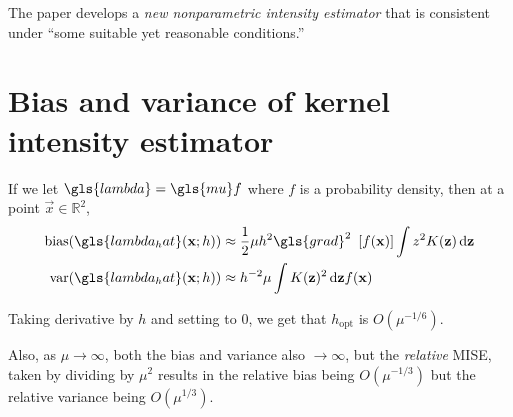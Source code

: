 The paper develops a \textit{new nonparametric intensity estimator} that is consistent under ``some suitable yet reasonable conditions.''

%
%
\section{Bias and variance of kernel intensity estimator}

If we let \(\gls{lambda} = \gls{mu} f\) where \(f\) is a probability density, then at a point \(\vec{x} \in \mathbb{R}^2\),
\begin{align}
\mbox{bias}(\gls{lambda_hat}(\vec{x};h)) & \approx \frac{1}{2} \mu h^2 \gls{grad}^2~\left[ f(\vec{x}) \right] \int {z^2 K(\vec{z}) \diff \vec{z}} \\
\mbox{var}(\gls{lambda_hat}(\vec{x};h)) & \approx h^{-2} \mu \int {K(\vec{z})^2\diff \vec{z}} f(\vec{x})
\end{align}

Taking derivative by \(h\) and setting to \(0\), we get that \(h_{\mbox{opt}}\) is \(O(\mu^{-1/6})\).

Also, as \(\mu \to \infty\), both the bias and variance also \(\to \infty\),
but the \textit{relative} MISE, taken by dividing by \(\mu^2\) results in the relative bias being \(O(\mu^{-1/3})\)
but the relative variance being \(O(\mu^{1/3})\).



